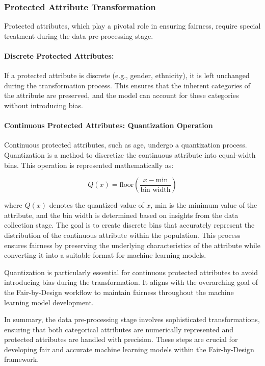 \subsubsection{Protected Attribute Transformation}

Protected attributes, which play a pivotal role in ensuring fairness, require special treatment during the data pre-processing stage.

\paragraph{Discrete Protected Attributes:}
If a protected attribute is discrete (e.g., gender, ethnicity), it is left unchanged during the transformation process. This ensures that the inherent categories of the attribute are preserved, and the model can account for these categories without introducing bias.

\paragraph{Continuous Protected Attributes: Quantization Operation}
Continuous protected attributes, such as age, undergo a quantization process. Quantization is a method to discretize the continuous attribute into equal-width bins. This operation is represented mathematically as:

\[ Q(x) = \text{{floor}}\left(\frac{{x - \text{{min}}}}{{\text{{bin width}}}}\right) \]

where \( Q(x) \) denotes the quantized value of \( x \), \(\text{{min}}\) is the minimum value of the attribute, and the bin width is determined based on insights from the data collection stage. The goal is to create discrete bins that accurately represent the distribution of the continuous attribute within the population. This process ensures fairness by preserving the underlying characteristics of the attribute while converting it into a suitable format for machine learning models.

Quantization is particularly essential for continuous protected attributes to avoid introducing bias during the transformation. It aligns with the overarching goal of the Fair-by-Design workflow to maintain fairness throughout the machine learning model development.

In summary, the data pre-processing stage involves sophisticated transformations, ensuring that both categorical attributes are numerically represented and protected attributes are handled with precision. These steps are crucial for developing fair and accurate machine learning models within the Fair-by-Design framework.

